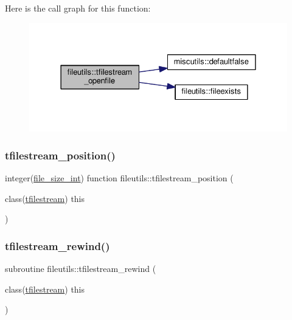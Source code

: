 Here is the call graph for this function\+:
\nopagebreak
\begin{figure}[H]
\begin{center}
\leavevmode
\includegraphics[width=328pt]{namespacefileutils_ae08cbb1a056e184eeab9c6a6a2181f24_cgraph}
\end{center}
\end{figure}
\mbox{\label{namespacefileutils_a3ee651544233289579c63ab2ffa3f6ce}} 
\subsubsection{\texorpdfstring{tfilestream\+\_\+position()}{tfilestream\_position()}}
{\footnotesize\ttfamily integer(\mbox{\hyperlink{namespacefileutils_a334ae57c14956bd4597df7a130f6e8a8}{file\+\_\+size\+\_\+int}}) function fileutils\+::tfilestream\+\_\+position (\begin{DoxyParamCaption}\item[{class(\mbox{\hyperlink{structfileutils_1_1tfilestream}{tfilestream}})}]{this }\end{DoxyParamCaption})\hspace{0.3cm}{\ttfamily [private]}}

\mbox{\label{namespacefileutils_a0c1819d96b0ed98d4ae2ebd441d5810f}} 
\subsubsection{\texorpdfstring{tfilestream\+\_\+rewind()}{tfilestream\_rewind()}}
{\footnotesize\ttfamily subroutine fileutils\+::tfilestream\+\_\+rewind (\begin{DoxyParamCaption}\item[{class(\mbox{\hyperlink{structfileutils_1_1tfilestream}{tfilestream}})}]{this }\end{DoxyParamCaption})\hspace{0.3cm}{\ttfamily [private]}}

